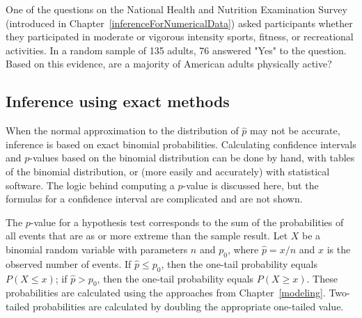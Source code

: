 
\textD{\newpage}

\begin{exercisewrap}
\begin{nexercise}
One of the questions on the National Health and Nutrition Examination Survey (introduced in Chapter~\ref{inferenceForNumericalData}) asked participants whether they participated in moderate or vigorous intensity sports, fitness, or recreational activities. In a random sample of 135 adults, 76 answered "Yes" to the question. Based on this evidence, are a majority of American adults physically active?\footnotemark{}
\end{nexercise}
\end{exercisewrap}


\subsection{Inference using exact methods}
\label{exactMethodsSingleBinomial}

When the normal approximation to the distribution of $\hat{p}$ may not be accurate, inference is based on exact binomial probabilities. Calculating confidence intervals and $p$-values based on the binomial distribution can be done by hand, with tables of the binomial distribution, or (more easily and accurately) with statistical software. The logic behind computing a $p$-value is discussed here, but the formulas for a confidence interval are complicated and are not shown.

The $p$-value for a hypothesis test corresponds to the sum of the probabilities of all events that are as or more extreme than the sample result. Let $X$ be a binomial random variable with parameters $n$ and $p_0$, where $\hat{p} = x/n$ and $x$ is the observed number of events. If $\hat{p} \leq p_0$, then the one-tail probability equals $P(X \leq x)$; if $\hat{p} > p_0$, then the one-tail probability equals $P(X \geq x)$. These probabilities are calculated using the approaches from Chapter~\ref{modeling}. Two-tailed probabilities are calculated by doubling the appropriate one-tailed value.


